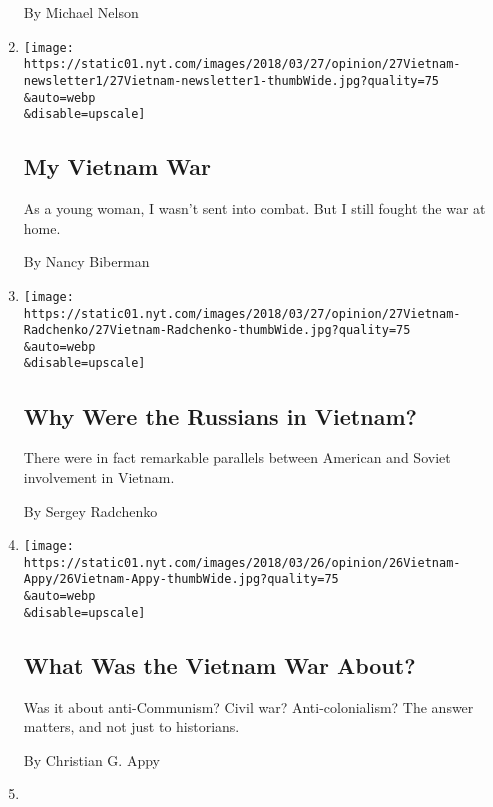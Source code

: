 \begin{enumerate}
  By Michael Nelson
\item
  \href{/2018/03/27/opinion/my-vietnam-war.html}{}

  \texttt{[image: https://static01.nyt.com/images/2018/03/27/opinion/27Vietnam-newsletter1/27Vietnam-newsletter1-thumbWide.jpg?quality=75\\\&auto=webp\\\&disable=upscale]}

  \hypertarget{my-vietnam-war}{%
  \subsection{My Vietnam War}\label{my-vietnam-war}}

  As a young woman, I wasn't sent into combat. But I still fought the
  war at home.

  By Nancy Biberman
\item
  \href{/2018/03/27/opinion/russians-vietnam-war.html}{}

  \texttt{[image: https://static01.nyt.com/images/2018/03/27/opinion/27Vietnam-Radchenko/27Vietnam-Radchenko-thumbWide.jpg?quality=75\\\&auto=webp\\\&disable=upscale]}

  \hypertarget{why-were-the-russians-in-vietnam}{%
  \subsection{Why Were the Russians in
  Vietnam?}\label{why-were-the-russians-in-vietnam}}

  There were in fact remarkable parallels between American and Soviet
  involvement in Vietnam.

  By Sergey Radchenko
\item
  \href{/2018/03/26/opinion/what-was-the-vietnam-war-about.html}{}

  \texttt{[image: https://static01.nyt.com/images/2018/03/26/opinion/26Vietnam-Appy/26Vietnam-Appy-thumbWide.jpg?quality=75\\\&auto=webp\\\&disable=upscale]}

  \hypertarget{what-was-the-vietnam-war-about}{%
  \subsection{What Was the Vietnam War
  About?}\label{what-was-the-vietnam-war-about}}

  Was it about anti-Communism? Civil war? Anti-colonialism? The answer
  matters, and not just to historians.

  By Christian G. Appy
\item
  \href{/2018/03/24/opinion/lyndon-johnson-vietnam.html}{}


\end{enumerate}
